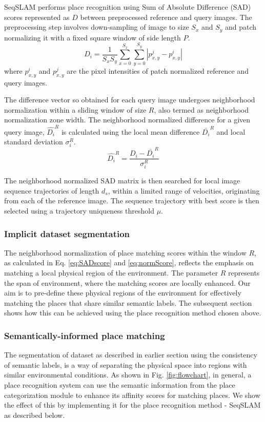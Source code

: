 \documentclass[letterpaper, 10 pt, conference]{ieeeconf}  %
\begin{document}
SeqSLAM performs place recognition using Sum of Absolute Difference (SAD) scores represented as $D$ between preprocessed reference and query images. The preprocessing step involves down-sampling of image to size $S_x$ and $S_y$ and patch normalizing it with a fixed square window of side length $P$.
\begin{equation}
 D_i = \frac{1}{S_xS_y} \sum\limits_{x=0}^{S_x}\sum\limits_{y=0}^{S_y}|p_{x,y}^j-p_{x,y}^i|
 \label{eq:SADscore}
\end{equation}
where $p_{x,y}^i$ and $p_{x,y}^j$ are the pixel intensities of patch normalized reference and query images.

The difference vector so obtained for each query image undergoes neighborhood normalization within a sliding window of size $R$, also termed as neighborhood normalization zone width. The neighborhood normalized difference for a given query image, $\hat{D_i}^R$ is calculated using the local mean difference $\bar{D_i}^R$ and local standard deviation $\sigma_i^R$.
\begin{equation}
 \hat{D_i}^R = \frac{D_i-\bar{D_i}^R}{\sigma_i^R}
 \label{eq:normScore}
\end{equation}

The neighborhood normalized SAD matrix is then searched for local image sequence trajectories of length $d_s$, within a limited range of velocities, originating from each of the reference image. The sequence trajectory with best score is then selected using a trajectory uniqueness threshold $\mu$.

\subsubsection{Implicit dataset segmentation}
The neighborhood normalization of place matching scores within the window $R$, as calculated in Eq. \ref{eq:SADscore} and \ref{eq:normScore}, reflects the emphasis on matching a local physical region of the environment. The parameter $R$ represents the span of environment, where the matching scores are locally enhanced. Our aim is to pre-define these physical regions of the environment for effectively matching the places that share similar semantic labels. The subsequent section shows how this can be achieved using the place recognition method chosen above.

\subsubsection{Semantically-informed place matching}
The segmentation of dataset as described in earlier section using the consistency of semantic labels, is a way of separating the physical space into regions with similar environmental conditions. As shown in Fig. \ref{fig:flowchart}, in general, a place recognition system can use the semantic information from the place categorization module to enhance its affinity scores for matching places. We show the effect of this by implementing it for the place recognition method - SeqSLAM as described below.
\end{document}
